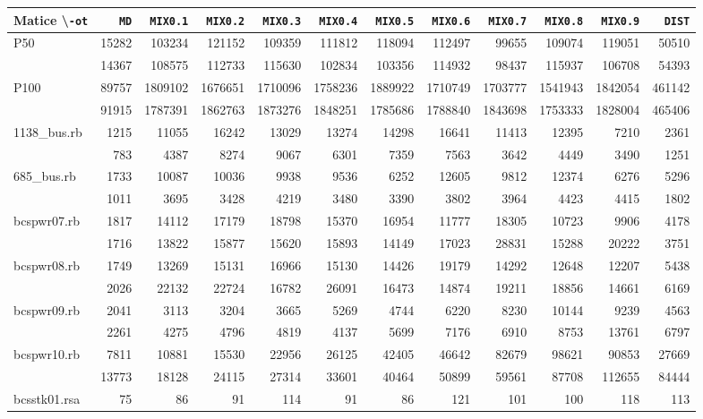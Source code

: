 \documentclass[11pt,american,czech,oneside]{book}
\theoremstyle{plain}
\theoremstyle{definition}
\begin{document}
\bigskip
{\noindent
\scriptsize
  \centering
  \renewcommand{\arraystretch}{1.1}
  \setlength{\tabcolsep}{0.25em}
\begin{tabular}{|l|rrrrrrrrrrr|}
  \hline
  Matice \textbackslash \texttt{-ot}& \texttt{MD} & \texttt{MIX0.1} & \texttt{MIX0.2} & \texttt{MIX0.3} & \texttt{MIX0.4} & \texttt{MIX0.5} & \texttt{MIX0.6} & \texttt{MIX0.7} & \texttt{MIX0.8} & \texttt{MIX0.9} & \texttt{DIST} \\
  \hline
  \multirow{2}{*}{P50}&15282&103234&121152&109359&111812&118094&112497&99655&109074&119051&50510	\\
  &14367&108575&112733&115630&102834&103356&114932&98437&115937&106708&54393	\\
  \hline
  \multirow{2}{*}{P100}&89757&1809102&1676651&1710096&1758236&1889922&1710749&1703777&1541943&1842054&461142	\\
  &91915&1787391&1862763&1873276&1848251&1785686&1788840&1843698&1753333&1828004&465406	\\
  \hline
  \multirow{2}{*}{1138\_bus.rb}&1215&11055&16242&13029&13274&14298&16641&11413&12395&7210&2361	\\
  &783&4387&8274&9067&6301&7359&7563&3642&4449&3490&1251	\\
  \hline
  \multirow{2}{*}{685\_bus.rb}&1733&10087&10036&9938&9536&6252&12605&9812&12374&6276&5296	\\
  &1011&3695&3428&4219&3480&3390&3802&3964&4423&4415&1802	\\
  \hline
  \multirow{2}{*}{bcspwr07.rb}&1817&14112&17179&18798&15370&16954&11777&18305&10723&9906&4178	\\
  &1716&13822&15877&15620&15893&14149&17023&28831&15288&20222&3751	\\
  \hline
  \multirow{2}{*}{bcspwr08.rb}&1749&13269&15131&16966&15130&14426&19179&14292&12648&12207&5438	\\
  &2026&22132&22724&16782&26091&16473&14874&19211&18856&14661&6169	\\
  \hline
  \multirow{2}{*}{bcspwr09.rb}&2041&3113&3204&3665&5269&4744&6220&8230&10144&9239&4563	\\
  &2261&4275&4796&4819&4137&5699&7176&6910&8753&13761&6797	\\
  \hline
  \multirow{2}{*}{bcspwr10.rb}&7811&10881&15530&22956&26125&42405&46642&82679&98621&90853&27669	\\
  &13773&18128&24115&27314&33601&40464&50899&59561&87708&112655&84444	\\
  \hline
  \multirow{2}{*}{bcsstk01.rsa}&75&86&91&114&91&86&121&101&100&118&113	\\

\end{tabular}}
\end{document}
